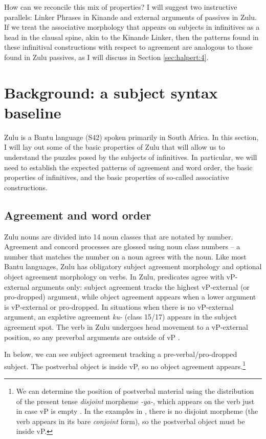 \documentclass[output=paper,colorlinks,citecolor=brown]{langscibook}
\begin{document}
How can we reconcile this mix of properties? I will suggest two instructive parallels: Linker Phrases in Kinande \citep{BakerCollins2006, Schneider-Zioga2015ACAL, Schneider-Zioga2015WCCFL} and external arguments of passives in Zulu. If we treat the associative morphology that appears on subjects in infinitives as a head in the clausal spine, akin to the Kinande Linker, then the patterns found in these infinitival constructions with respect to agreement are analogous to those found in Zulu passives, as I will discuss in Section \ref{sec:halpert:4}. 

\section{Background: a subject syntax baseline}\label{sec:halpert:2}

Zulu is a Bantu language (S42) spoken primarily in South Africa.  In this section, I will lay out some of the basic properties of Zulu that will allow us to understand the puzzles posed by the subjects of infinitives.  In particular, we will need to establish the expected patterns of agreement and word order, the basic properties of infinitives, and the basic properties of so-called associative constructions.

\subsection{Agreement and word order}\label{sec:halpert:2.1}

Zulu nouns are divided into 14 noun classes that are notated by number. Agreement and concord processes are glossed using  noun class numbers – a number that matches the number on a noun agrees with the noun. Like most Bantu languages, Zulu has obligatory subject agreement morphology and optional object agreement morphology on verbs. In Zulu, predicates agree with vP-external arguments only: subject agreement tracks the highest vP-external (or pro-dropped) argument, while object agreement appears when a lower argument is vP-external or pro-dropped. In situations when there is no vP-external argument, an expletive agreement \textit{ku-} (class 15/17) appears in the subject agreement spot.  The verb in Zulu undergoes head movement to a vP-external position, so any preverbal arguments are outside of vP \citep{Buell2005,Halpert2015}.

In  below, we can see subject agreement tracking a pre-verbal/pro-dropped subject.  The postverbal object is inside vP, so no object agreement appears.\footnote{We can determine the position of postverbal material using the distribution of the present tense \textit{disjoint} morpheme \textit{-ya-}, which appears on the verb just in case vP is empty \citep{Buell2005, Halpert2015, Halpert2017}.  In the examples in , there is no disjoint morpheme (the verb appears in its bare \textit{conjoint} form), so the postverbal object must be inside vP.}
\end{document}
